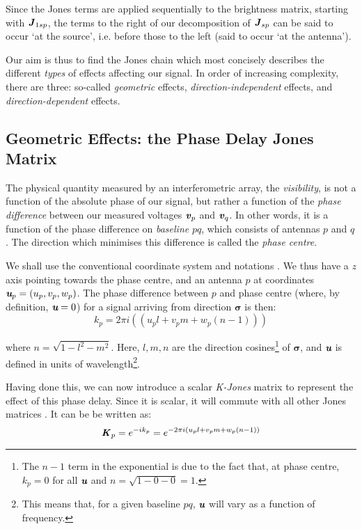 \pg
Since the Jones terms are applied sequentially to the brightness matrix, starting with $\Jones_{1sp}$, the terms to the right of our decomposition of $\Jones_{sp}$ can be said to occur `at the source', i.e. before those to the left (said to occur `at the antenna').

\pg
Our aim is thus to find the Jones chain which most concisely describes the different \emph{types} of effects affecting our signal. In order of increasing complexity, there are three: so-called \emph{geometric} effects, \emph{direction-independent} effects, and \emph{direction-dependent} effects.

\subsection{Geometric Effects: the Phase Delay Jones Matrix}
\label{section.RIME.JonesChain.Kjones}

\pg
The physical quantity measured by an interferometric array, the \emph{visibility}, is not a function of the absolute phase of our signal, but rather a function of the \emph{phase difference} between our measured voltages $\volt_p$ and $\volt_q$. In other words, it is a function of the phase difference on \emph{baseline} $pq$, which consists of antennas $p$ and $q$. The direction which minimises this difference is called the \emph{phase centre}.

\pg
We shall use the conventional coordinate system and notations . We thus have a $z$ axis pointing towards the phase centre, and an antenna $p$ at coordinates $\U_p=(u_p,v_p,w_p)$. The phase difference between $p$ and phase centre (where, by definition, $\U=0$) for a signal arriving from direction $\pmb{\sigma}$ is then:
\begin{equation}
k_p=2\pi i (( u_p l + v_p m + w_p (n-1) ))
\end{equation}

where $n=\sqrt{1-l^2-m^2}$. Here, $l,m,n$ are the direction cosines\footnote{The $n-1$ term in the exponential is due to the fact that, at phase centre, $k_p=0$ for all $\U$ and $n=\sqrt{1-0-0}=1$.} of $\pmb{\sigma}$, and $\U$ is defined in units of wavelength\footnote{This means that, for a given baseline $pq$, $\U$ will vary as a function of frequency.}.

\pg 
Having done this, we can now introduce a scalar \emph{K-Jones} matrix to represent the effect of this phase delay. Since it is scalar, it will commute with all other Jones matrices . It can be be written as:
\begin{equation}
\Kjones_p = e^{-i k_p}  = e^{-2\pi i ( u_p l + v_p m + w_p (n-1) )}
\end{equation}

